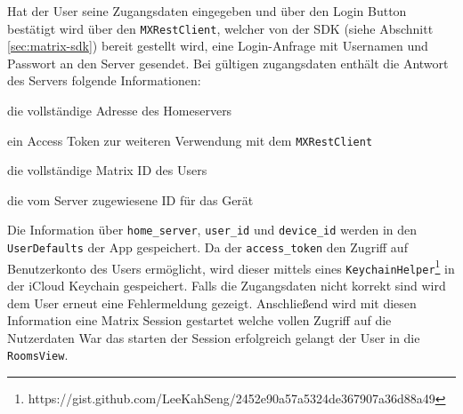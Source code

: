     Hat der User seine Zugangsdaten eingegeben und über den Login Button bestätigt wird über den \texttt{MXRestClient}, welcher von der SDK (siehe Abschnitt \ref{sec:matrix-sdk}) bereit gestellt wird, eine Login-Anfrage mit Usernamen und Passwort an den Server gesendet.
    Bei gültigen zugangsdaten enthält die Antwort des Servers folgende Informationen:
    \begin{description}[leftmargin=!,labelwidth=3cm]
        \item [home\_server] die vollständige Adresse des Homeservers
        \item [access\_token] ein Access Token zur weiteren Verwendung mit dem \texttt{MXRestClient}
        \item [user\_id] die vollständige Matrix ID des Users
        \item [device\_id] die vom Server zugewiesene ID für das Gerät
    \end{description}
    Die Information über \texttt{home\_server}, \texttt{user\_id} und \texttt{device\_id} werden in den \texttt{UserDefaults} der App gespeichert.
    Da der \texttt{access\_token} den Zugriff auf Benutzerkonto des Users ermöglicht, wird dieser mittels eines \texttt{KeychainHelper}\footnote{https://gist.github.com/LeeKahSeng/2452e90a57a5324de367907a36d88a49} in der iCloud Keychain gespeichert.
    Falls die Zugangsdaten nicht korrekt sind wird dem User erneut eine Fehlermeldung gezeigt.
    Anschließend wird mit diesen Information eine Matrix Session gestartet welche vollen Zugriff auf die Nutzerdaten
    War das starten der Session erfolgreich gelangt der User in die \texttt{RoomsView}.\\

